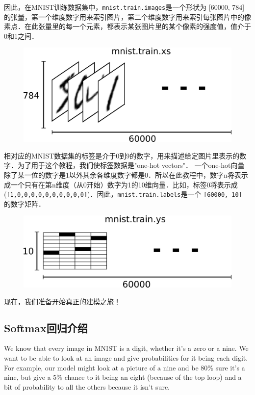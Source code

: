 因此，在MNIST训练数据集中，\lstinline{mnist.train.images}是一个形状为 [60000, 784] 的张量，第一个维度数字用来索引图片，第二个维度数字用来索引每张图片中的像素点．在此张量里的每一个元素，都表示某张图片里的某个像素的强度值，值介于0和1之间．

\begin{figure}[htbp]
\centering
\includegraphics[width=.7\textwidth]{../SOURCE/images/mnist-train-xs.png}
\caption{}
\end{figure}

相对应的MNIST数据集的标签是介于0到9的数字，用来描述给定图片里表示的数字．为了用于这个教程，我们使标签数据是"one-hot vectors"． 一个one-hot向量除了某一位的数字是1以外其余各维度数字都是0．所以在此教程中，数字n将表示成一个只有在第n维度（从0开始）数字为1的10维向量．比如，标签0将表示成(\lstinline{[1,0,0,0,0,0,0,0,0,0,0]})．因此，\lstinline{mnist.train.labels}是一个 \lstinline{[60000, 10]} 的数字矩阵．

\begin{figure}[htbp]
\centering
\includegraphics[width=.7\textwidth]{../SOURCE/images/mnist-train-ys.png}
\caption{}
\end{figure}

现在，我们准备开始真正的建模之旅！

\subsection {Softmax回归介绍}

We know that every image in MNIST is a digit, whether it's a zero or a nine. We want to be able to look at an image and give probabilities for it being each digit. For example, our model might look at a picture of a nine and be 80\% sure it's a nine, but give a 5\% chance to it being an eight (because of the top loop) and a bit of probability to all the others because it isn't sure.

